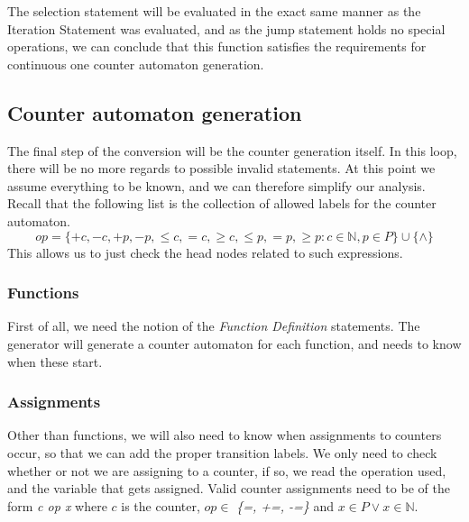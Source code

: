 \documentclass[12pt]{article}
\begin{document}
The selection statement will be evaluated in the exact same manner as the Iteration Statement was evaluated, and as the jump statement holds no special operations, we can conclude that this function satisfies the requirements for continuous one counter automaton generation.

\subsection{Counter automaton generation}
\label{sec:generation}
The final step of the conversion will be the counter generation itself. In this loop, there will be no more regards to possible invalid statements. At this point we assume everything to be known, and we can therefore simplify our analysis. Recall that the following list is the collection of allowed labels for the counter automaton.
\[
op = \{+c, -c, +p, -p, \leq c, =c, \geq c, \leq p, =p, \geq p: c \in \mathbb{N}, p \in P\} \cup \{\wedge\}
\]
This allows us to just check the head nodes related to such expressions.

\subsubsection{Functions}
First of all, we need the notion of the \textit{Function Definition} statements. The generator will generate a counter automaton for each function, and needs to know when these start.

\subsubsection{Assignments}
Other than functions, we will also need to know when assignments to counters occur, so that we can add the proper transition labels. We only need to check whether or not we are assigning to a counter, if so, we read the operation used, and the variable that gets assigned. Valid counter assignments need to be of the form \textit{c op x} where $c$ is the counter, $op \in $ \textit{\{=, +=, -=\}} and $x \in P \lor x \in \mathbb{N}$. 
\end{document}

